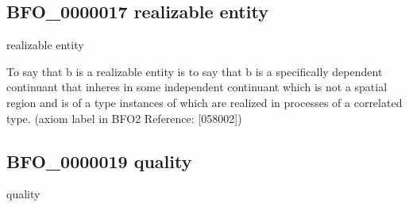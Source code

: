 \documentclass[letterpaper,10pt,english]{sphinxmanual}
\begin{document}
\subsection{BFO\_0000017 \sphinxhyphen{} realizable entity}
\label{\detokenize{doc-BFO_0000017:bfo-0000017-realizable-entity}}\label{\detokenize{doc-BFO_0000017:index-0}}\label{\detokenize{doc-BFO_0000017::doc}}
\begin{sphinxShadowBox}

\sphinxAtStartPar
realizable entity
\end{sphinxShadowBox}

\begin{sphinxShadowBox}

\sphinxAtStartPar
{\hyperref[\detokenize{doc-BFO_0000020::doc}]{}}
\end{sphinxShadowBox}

\begin{sphinxShadowBox}

\sphinxAtStartPar
To say that b is a realizable entity is to say that b is a specifically dependent continuant that inheres in some independent continuant which is not a spatial region and is of a type instances of which are realized in processes of a correlated type. (axiom label in BFO2 Reference: {[}058\sphinxhyphen{}002{]})
\end{sphinxShadowBox}

\begin{sphinxShadowBox}

\sphinxAtStartPar
{}
\end{sphinxShadowBox}
\begin{quote}

\ignorespaces \end{quote}


\subsection{BFO\_0000019 \sphinxhyphen{} quality}
\label{\detokenize{doc-BFO_0000019:bfo-0000019-quality}}\label{\detokenize{doc-BFO_0000019:index-0}}\label{\detokenize{doc-BFO_0000019::doc}}
\begin{sphinxShadowBox}

\sphinxAtStartPar
quality
\end{sphinxShadowBox}
\end{document}
